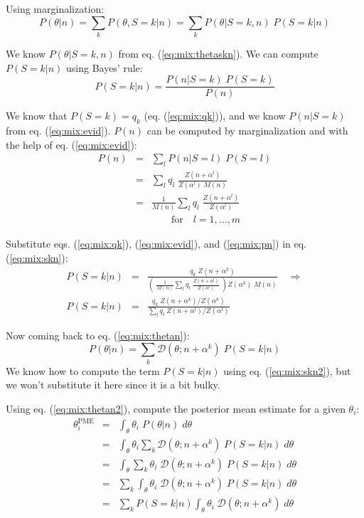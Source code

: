 Using marginalization:
\begin{equation}
P(\theta|n) = \sum_{k} P(\theta, S=k | n) 
            = \sum_{k} P(\theta | S=k, n) \; P(S=k|n)
\label{eq:mix:thetan}
\end{equation}

We know $P(\theta | S=k, n)$ from eq. (\ref{eq:mix:thetaskn}).
We can compute $P(S=k|n)$ using Bayes' rule:
\begin{equation}
P(S=k|n) = \frac{ P(n|S=k) \; P(S=k) }{ P(n) }
\label{eq:mix:skn}
\end{equation}

We know that $P(S=k) = q_k$ (eq. (\ref{eq:mix:qk})), 
and we know $P(n|S=k)$ from eq. (\ref{eq:mix:evid}).
$P(n)$ can be computed by marginalization and with the help of eq. (\ref{eq:mix:evid}):
\begin{eqnarray}
P(n) & = & \sum_{l} P(n | S=l) \; P(S=l)  \\
     & = & \sum_{l} q_l \; \frac{Z(n + \alpha^l)}{Z(\alpha^l) \; M(n)} \\
     & = & \frac{1}{M(n)} \sum_{l} q_l \; \frac{Z(n + \alpha^l)}{Z(\alpha^l)} 
\label{eq:mix:pn}
\\
& & \quad \quad \text{for} \quad l=1,..., m \nonumber
\end{eqnarray}

Substitute eqs. (\ref{eq:mix:qk}), (\ref{eq:mix:evid}), and (\ref{eq:mix:pn}) in eq. (\ref{eq:mix:skn}):
\begin{eqnarray}
P(S=k|n) & = &
\frac{q_k \; Z(n + \alpha^k)}
     { \left( \; 
         \frac{1}{M(n)} \sum_{l} q_l \; \frac{Z(n + \alpha^l)}{Z(\alpha^l)} 
 \; \right) Z(\alpha^k) \; M(n) }
\quad \Rightarrow \\
P(S=k|n) & = &
\frac{q_k \; Z(n + \alpha^k) / Z(\alpha^k) }
     {\sum_{l} q_l \; Z(n + \alpha^l) / Z(\alpha^l) }
\label{eq:mix:skn2}
\end{eqnarray}

Now coming back to eq. (\ref{eq:mix:thetan}):
\begin{equation}
P(\theta|n) = \sum_{k} \mathcal{D}(\theta; n + \alpha^k) \; P(S=k|n)
\label{eq:mix:thetan2}
\end{equation}
We know how to compute the term $P(S=k|n)$ using eq. (\ref{eq:mix:skn2}), but we won't substitute it here since it is a bit bulky.

Using eq. (\ref{eq:mix:thetan2}), compute the posterior mean estimate for a given $\theta_i$:
\begin{eqnarray}
\theta_i^{\text{PME}} & = & \int_\theta \theta_i \; P(\theta|n) \; d \theta 
\\
& = &
   \int_\theta \theta_i \sum_{k} \mathcal{D}(\theta; n + \alpha^k)
   \; P(S=k|n) \; d \theta
\\
& = &
   \int_\theta \sum_{k} \theta_i \; \mathcal{D}(\theta; n + \alpha^k)
   \; P(S=k|n) \; d \theta
\\
& = &
   \sum_{k} \int_\theta \theta_i \; \mathcal{D}(\theta; n + \alpha^k)
   \; P(S=k|n) \; d \theta
\\
& = &
   \sum_{k} 
P(S=k|n) 
\int_\theta \theta_i \; \mathcal{D}(\theta; n + \alpha^k)
   \; d \theta
\label{eq:mix:thetapme}
\end{eqnarray}

